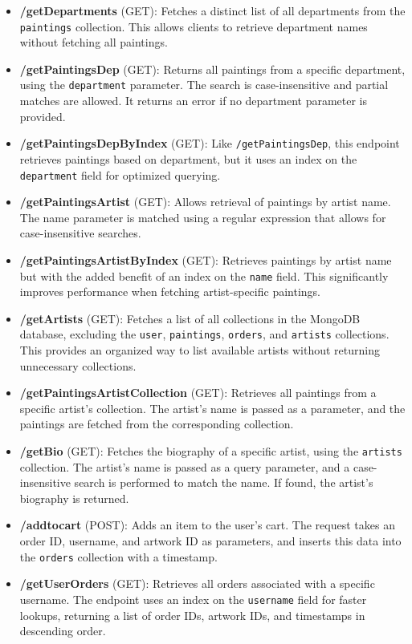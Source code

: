 \documentclass[a4paper,12pt]{article}
\begin{document}
\begin{itemize}
    \item \textbf{/getDepartments} (GET): Fetches a distinct list of all departments from the \texttt{paintings} collection. This allows clients to retrieve department names without fetching all paintings.

    \item \textbf{/getPaintingsDep} (GET): Returns all paintings from a specific department, using the \texttt{department} parameter. The search is case-insensitive and partial matches are allowed. It returns an error if no department parameter is provided.

    \item \textbf{/getPaintingsDepByIndex} (GET): Like \texttt{/getPaintingsDep}, this endpoint retrieves paintings based on department, but it uses an index on the \texttt{department} field for optimized querying.

    \item \textbf{/getPaintingsArtist} (GET): Allows retrieval of paintings by artist name. The name parameter is matched using a regular expression that allows for case-insensitive searches.

    \item \textbf{/getPaintingsArtistByIndex} (GET): Retrieves paintings by artist name but with the added benefit of an index on the \texttt{name} field. This significantly improves performance when fetching artist-specific paintings.

    \item \textbf{/getArtists} (GET): Fetches a list of all collections in the MongoDB database, excluding the \texttt{user}, \texttt{paintings}, \texttt{orders}, and \texttt{artists} collections. This provides an organized way to list available artists without returning unnecessary collections.

    \item \textbf{/getPaintingsArtistCollection} (GET): Retrieves all paintings from a specific artist's collection. The artist's name is passed as a parameter, and the paintings are fetched from the corresponding collection.

    \item \textbf{/getBio} (GET): Fetches the biography of a specific artist, using the \texttt{artists} collection. The artist's name is passed as a query parameter, and a case-insensitive search is performed to match the name. If found, the artist's biography is returned.

    \item \textbf{/addtocart} (POST): Adds an item to the user's cart. The request takes an order ID, username, and artwork ID as parameters, and inserts this data into the \texttt{orders} collection with a timestamp.

    \item \textbf{/getUserOrders} (GET): Retrieves all orders associated with a specific username. The endpoint uses an index on the \texttt{username} field for faster lookups, returning a list of order IDs, artwork IDs, and timestamps in descending order.

\end{itemize}
\end{document}
